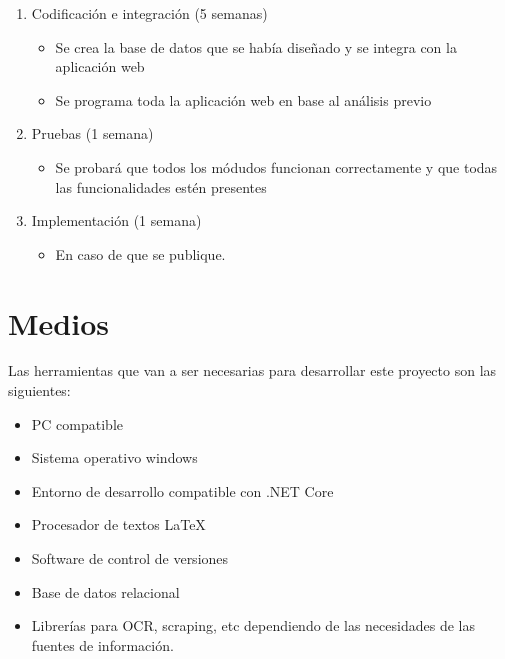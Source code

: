 \begin{enumerate}
\item Codificaci\'on e integraci\'on (5 semanas)
  \begin{itemize}
  \item Se crea la base de datos que se había diseñado y se integra con la aplicación web
  \item Se programa toda la aplicación web en base al análisis previo
  \end{itemize}

\item Pruebas (1 semana)
  \begin{itemize}
  \item Se probará que todos los módudos funcionan correctamente y que todas las funcionalidades estén presentes
  \end{itemize}

\item Implementaci\'on  (1 semana)
  \begin{itemize}
  \item En caso de que se publique.
  \end{itemize}

\end{enumerate}


\section{Medios}
\label{sec:medios}

Las herramientas que van a ser necesarias para desarrollar este proyecto
son las siguientes:

\begin{itemize}
\item PC compatible
\item Sistema operativo windows~\cite{windows}
\item Entorno de desarrollo compatible con .NET Core ~\cite{dotnetwhat} ~\cite{dotnet}
\item Procesador de textos \LaTeX~\cite{lamport94}
\item Software de control de versiones~\cite{git}
\item Base de datos relacional
\item Librerías para OCR, scraping, etc dependiendo de las necesidades de las fuentes de información.
\end{itemize}




% 







